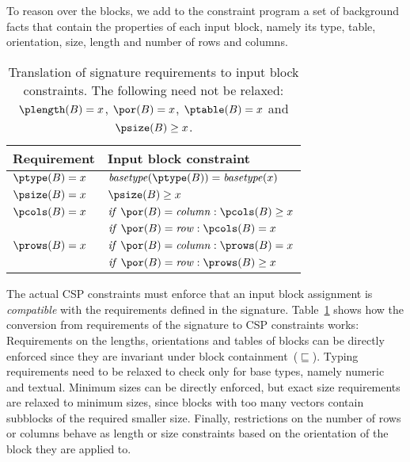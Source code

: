 
To reason over the blocks, we add to the constraint program a set of background facts that contain the properties of each input block, namely its type, table, orientation, size, length and number of rows and columns.

\begin{table}[t]
  \caption{Translation of signature requirements to input block constraints. The following need not be relaxed: $\plength(B) = x$, $\por(B) = x$, $\ptable(B) = x$ and $\psize(B) \geq x$.}
  \label{tbl:translation}
  \begin{tabularx}{\linewidth}{lX}
    \textbf{Requirement} & \textbf{Input block constraint} \\ \hline \hline
    $\ptype(B) = x$ & $\mathit{basetype}(\ptype(B)) = \mathit{basetype}(x)$ \\ \hline
    $\psize(B) = x$ & $\psize(B) \geq x$ \\ \hline
    $\pcols(B) = x$ & $\mathit{if}~\por(B) = \mathit{column}: \pcols(B) \geq x$ \\ 
    & $\mathit{if}~\por(B) = \mathit{row}: \pcols(B) = x$ \\ \hline
    $\prows(B) = x$ & $\mathit{if}~\por(B) = \mathit{column}: \prows(B) = x$ \\ 
    & $\mathit{if}~\por(B) = \mathit{row}: \prows(B) \geq x$
  \end{tabularx}
\end{table}

The actual CSP constraints must enforce that an input block assignment is \textit{compatible} with the requirements defined in the signature.
%
Table~\ref{tbl:translation} shows how the conversion from requirements of the signature to CSP constraints works:
Requirements on the lengths, orientations and tables of blocks can be directly enforced since they are invariant under block containment~($\sqsubseteq$).
Typing requirements need to be relaxed to check only for base types, namely numeric and textual.
Minimum sizes can be directly enforced, but exact size requirements are relaxed to minimum sizes, since blocks with too many vectors contain subblocks of the required smaller size.
Finally, restrictions on the number of rows or columns behave as length or size constraints based on the orientation of the block they are applied to.

